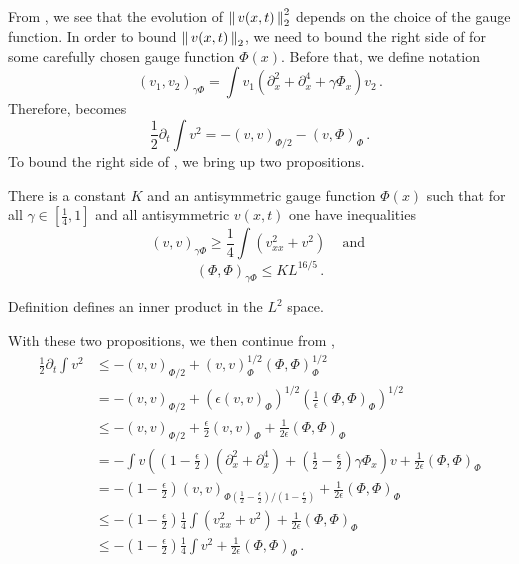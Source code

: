 From , we see that the evolution of $\left\Arrowvert \, v(x,t) \, \right\Arrowvert_{2}^2$ depends
on the choice of the gauge function. In order to bound $\left\Arrowvert \, v(x,t) \, \right\Arrowvert_{2}$, we need
to bound the right side of  for some carefully
chosen gauge function $\Phi(x)$. Before that, we define notation
\begin{equation}
  \label{eq:ks_inner}
  (v_1, v_2)_{\gamma \Phi} = \int v_1(\partial_x^2 + \partial_x^4 + \gamma \Phi_x)v_2
  \,.
\end{equation}
Therefore,  becomes
\begin{equation}
  \label{eq:ks_v2_new}
  \frac{1}{2} \partial_t \int v^2  = -(v, v)_{\Phi/2} -(v, \Phi)_{\Phi}
  \,.
\end{equation}
To bound the right side of , we bring up two propositions.
\begin{proposition}
  There is a constant $K$
  and an antisymmetric gauge function $\Phi(x)$ such that for
  all $\gamma\in[\frac{1}{4}, 1]$ and all antisymmetric
  $v(x, t)$ one have inequalities
  \begin{equation}
    \label{eq:ks_prop_1}
    (v, v)_{\gamma\Phi} \ge \frac{1}{4} \int(v_{xx}^2 + v^2)
    \,\quad \text{and }
  \end{equation}
  \begin{equation}
    \label{eq:ks_prop_2}
    (\Phi, \Phi)_{\gamma\Phi} \le KL^{16/5}
    \,.
  \end{equation}
  \label{PROP:KS1}
\end{proposition}
\begin{proposition}
  Definition  defines an inner product in the $L^2$ space.
  \label{prop:ks_2}
\end{proposition}
With these two propositions, we then continue from ,
\begin{align}
  \frac{1}{2} \partial_t \int v^2
  & \le -(v, v)_{\Phi/2} + (v, v)_{\Phi}^{1/2} (\Phi, \Phi)_{\Phi}^{1/2}
    \label{eq:ks_v2_step1} \\
  & = -(v, v)_{\Phi/2} + \left(\epsilon (v, v)_{\Phi}\right)^{1/2}
    \left(\frac{1}{\epsilon}(\Phi, \Phi)_{\Phi}\right)^{1/2}
    \nonumber \\
  & \le -(v, v)_{\Phi/2} + \frac{\epsilon}{2}(v, v)_{\Phi} +
    \frac{1}{2\epsilon}(\Phi, \Phi)_{\Phi}
    \nonumber \\
  & = -\int v\left((1 - \frac{\epsilon}{2})(\partial_x^2 + \partial_x^4)
    + (\frac{1}{2}-\frac{\epsilon}{2})\gamma \Phi_x \right)v +
    \frac{1}{2\epsilon}(\Phi, \Phi)_{\Phi} \nonumber \\
  & = -(1 - \frac{\epsilon}{2})
    (v, v)_{\Phi(\frac{1}{2}-\frac{\epsilon}{2})/(1 - \frac{\epsilon}{2})} +
    \frac{1}{2\epsilon}(\Phi, \Phi)_{\Phi} \nonumber \\
  & \le -(1 - \frac{\epsilon}{2}) \frac{1}{4} \int(v_{xx}^2 + v^2) +
    \frac{1}{2\epsilon}(\Phi, \Phi)_{\Phi}
    \label{eq:ks_v2_step2} \\
  & \le -(1 - \frac{\epsilon}{2}) \frac{1}{4} \int v^2 +
    \frac{1}{2\epsilon}(\Phi, \Phi)_{\Phi} \nonumber
    \,.
\end{align}
